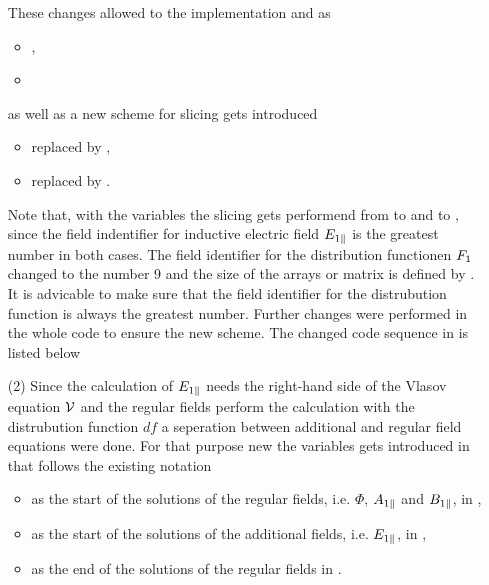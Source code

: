 \begin{enumerate}
\begin{itemize}
    \end{itemize}
    These changes allowed to the implementation  and  as 
    \begin{itemize}
        \item {}, 
        \item {}
    \end{itemize}
    as well as a new scheme for slicing gets introduced 
    \begin{itemize}
        \item {} replaced by , 
        \item {} replaced by .
    \end{itemize}
    Note that, with the variables the slicing gets performend from  to  and  to , since the field indentifier for inductive electric field $E_{1\parallel}$ is the greatest number in both cases.
    The field identifier for the distribution functionen $F_1$ changed to the number 9 and the size of the arrays or matrix is defined by . It is advicable to make sure that the field identifier for the distrubution function is always the greatest number. Further changes were performed in the whole code to ensure the new scheme. The changed code sequence in  is listed below
    
    \item[(2)] Since the calculation of $E_{1\parallel}$ needs the right-hand side of the Vlasov equation $\mathcal{V}$ and the regular fields perform the calculation with the distrubution function $df$ a seperation between additional and regular field equations were done. For that purpose new the variables gets introduced in  that follows the existing notation 
    \begin{itemize}
        \item {} as the start of the solutions of the regular fields, i.e. $\Phi$, $A_{1\parallel}$ and $B_{1\parallel}$, in ,
        \item {} as the start of the solutions of the additional fields, i.e. $E_{1\parallel}$, in ,
        \item {} as the end of the solutions of the regular fields in .

\end{itemize}
\end{enumerate}
